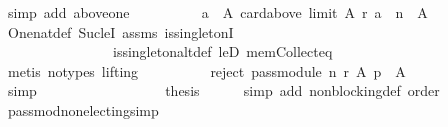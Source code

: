 \begin{isabellebody}
\ {\isacharparenleft}{\kern0pt}simp\ add{\isacharcolon}{\kern0pt}\ above{\isacharunderscore}{\kern0pt}one{\isacharparenright}{\kern0pt}\isanewline
\ \ \ \ \ \ \ \ \isamarkupfalse%
\ {\isachardoublequoteopen}{\isacharbraceleft}{\kern0pt}a\ {\isasymin}\ A{\isachardot}{\kern0pt}\ card{\isacharparenleft}{\kern0pt}above\ {\isacharparenleft}{\kern0pt}limit\ A\ r{\isacharparenright}{\kern0pt}\ a{\isacharparenright}{\kern0pt}\ {\isachargreater}{\kern0pt}\ n{\isacharbraceright}{\kern0pt}\ {\isasymnoteq}\ A{\isachardoublequoteclose}\isanewline
\ \ \ \ \ \ \ \ \ \ \isamarkupfalse%
\ One{\isacharunderscore}{\kern0pt}nat{\isacharunderscore}{\kern0pt}def\ Suc{\isacharunderscore}{\kern0pt}leI\ assms{\isacharparenleft}{\kern0pt}{}{\isacharparenright}{\kern0pt}\ is{\isacharunderscore}{\kern0pt}singletonI\isanewline
\ \ \ \ \ \ \ \ \ \ \ \ \ \ \ \ is{\isacharunderscore}{\kern0pt}singleton{\isacharunderscore}{\kern0pt}altdef\ leD\ mem{\isacharunderscore}{\kern0pt}Collect{\isacharunderscore}{\kern0pt}eq\isanewline
\ \ \ \ \ \ \ \ \ \ \isamarkupfalse%
\ {\isacharparenleft}{\kern0pt}metis\ {\isacharparenleft}{\kern0pt}no{\isacharunderscore}{\kern0pt}types{\isacharcomma}{\kern0pt}\ lifting{\isacharparenright}{\kern0pt}{\isacharparenright}{\kern0pt}\isanewline
\ \ \ \ \ \ \ \ \isamarkupfalse%
\ {\isachardoublequoteopen}reject\ {\isacharparenleft}{\kern0pt}pass{\isacharunderscore}{\kern0pt}module\ n\ r{\isacharparenright}{\kern0pt}\ A\ p\ {\isasymnoteq}\ A{\isachardoublequoteclose}\isanewline
\ \ \ \ \ \ \ \ \ \ \isamarkupfalse%
\ simp\isanewline
\ \ \ \ \ \ \isamarkupfalse%
\isanewline
\ \ \ \ \isamarkupfalse%
\isanewline
\ \ \isamarkupfalse%
\isanewline
\ \ \isamarkupfalse%
\ {\isacharquery}{\kern0pt}thesis\isanewline
\ \ \ \ \isamarkupfalse%
\ {\isacharparenleft}{\kern0pt}simp\ add{\isacharcolon}{\kern0pt}\ non{\isacharunderscore}{\kern0pt}blocking{\isacharunderscore}{\kern0pt}def\ order{\isacharparenright}{\kern0pt}\isanewline
{}\isamarkupfalse%
%
\endisatagproof
{\isafoldproof}%
%
\isadelimproof
%
\endisadelimproof
%
\isadelimdocument
%
\endisadelimdocument
%
\isatagdocument
%
\isamarkuptrue%
%
\endisatagdocument
{\isafolddocument}%
%
\isadelimdocument
%
\endisadelimdocument
{}\isamarkupfalse%
\ pass{\isacharunderscore}{\kern0pt}mod{\isacharunderscore}{\kern0pt}non{\isacharunderscore}{\kern0pt}electing{\isacharbrackleft}{\kern0pt}simp{\isacharbrackright}{\kern0pt}{\isacharcolon}{\kern0pt}\isanewline

\end{isabellebody}
